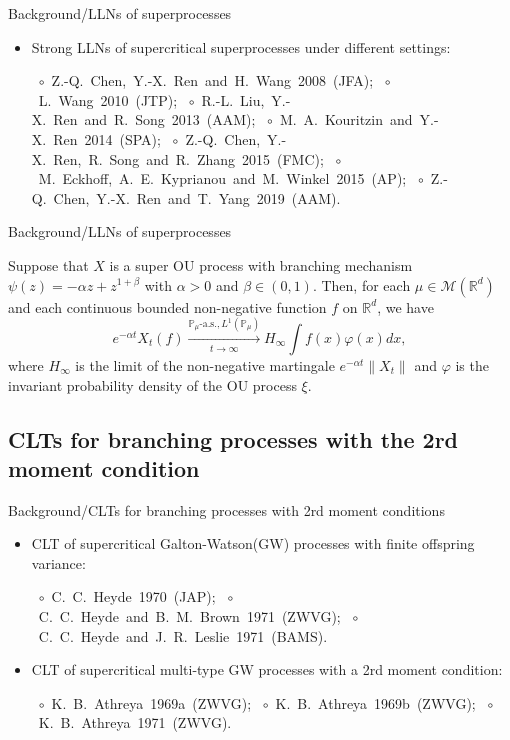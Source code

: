 \documentclass[xcolor=dvipsnames]{beamer}
\begin{document}
\begin{frame}{Background/LLNs of superprocesses}
\begin{itemize}
\item
  {\color{red} Strong LLNs of supercritical superprocesses} under different settings: 
  
  \mbox{ $\circ$ Z.-Q. Chen, Y.-X. Ren and H. Wang 2008 (JFA);} 
  \mbox{ $\circ$ L. Wang 2010 (JTP);} 
  \mbox{ $\circ$ R.-L. Liu, Y.-X. Ren and R. Song 2013 (AAM);} 
  \mbox{ $\circ$ M. A. Kouritzin and Y.-X. Ren 2014 (SPA);} 
  \mbox{ $\circ$ Z.-Q. Chen, Y.-X. Ren, R. Song and R. Zhang 2015 (FMC);} 
  \mbox{ $\circ$ M. Eckhoff, A. E. Kyprianou and M. Winkel 2015 (AP);} 
  \mbox{ $\circ$ Z.-Q. Chen, Y.-X. Ren and T. Yang 2019 (AAM).}
\end{itemize}
\let\thefootnote\relax{}
\end{frame}

\begin{frame}{Background/LLNs of superprocesses}
\begin{example}
	Suppose that $X$ is a super OU process with branching mechanism $\psi(z)=-\alpha z+ z^{1+\beta}$ with $\alpha>0$ and $\beta \in (0,1)$. Then, for each $\mu \in \mathcal M(\mathbb R^d)$ and each continuous bounded non-negative function $f$ on $\mathbb R^d$, we have
\[
	e^{-\alpha t} X_t(f) \xrightarrow[t\to \infty]{\mathbb P_\mu \text{-a.s.}, L^1(\mathbb P_\mu)} H_\infty \int f(x) \varphi(x) dx,
\]
	where $H_\infty$ is the limit of the non-negative martingale $e^{-\alpha t}\|X_t\|$ and $\varphi$ is the invariant probability density of the OU process $\xi$.
\end{example}
\end{frame}

\subsection{CLTs for branching processes with the 2rd moment condition}
\begin{frame}{Background/CLTs for branching processes with 2rd moment conditions}
\begin{itemize}
\item
	{\color{red} CLT of supercritical Galton-Watson(GW) processes} with finite offspring variance: 
  
  \mbox{ $\circ$ C. C. Heyde 1970 (JAP);}
  \mbox{ $\circ$ C. C. Heyde and B. M. Brown 1971 (ZWVG);}
  \mbox{ $\circ$ C. C. Heyde and J. R. Leslie 1971 (BAMS).}
\item 
	{\color{red} CLT of supercritical multi-type GW processes} with a 2rd moment condition:
  
  \mbox{ $\circ$ K. B. Athreya 1969a (ZWVG);}
  \mbox{ $\circ$ K. B. Athreya 1969b (ZWVG);} 
  \mbox{ $\circ$ K. B. Athreya 1971 (ZWVG).}
\end{itemize}
\let\thefootnote\relax{}
\end{frame}
\end{document}
